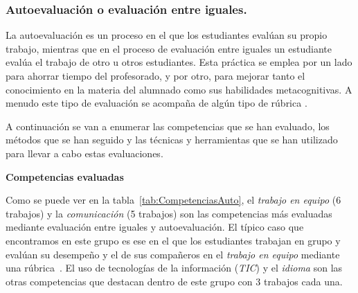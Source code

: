 \subsubsection{Autoevaluación o evaluación entre iguales.}

La autoevaluación es un proceso en el que los estudiantes evalúan su propio trabajo, mientras que  en el proceso de evaluación entre iguales un estudiante evalúa el trabajo de otro u otros estudiantes. Esta práctica se emplea por un lado para ahorrar tiempo del profesorado, y por otro, para mejorar tanto el conocimiento en la materia del alumnado como sus habilidades metacognitivas. A menudo este tipo de evaluación se acompaña de algún tipo de rúbrica \cite{malehorn1994ten}.

A continuación se van a enumerar las competencias que se han evaluado, los métodos que se han seguido y las técnicas y herramientas que se han utilizado para llevar a cabo estas evaluaciones.

\bigskip
\textbf{Competencias evaluadas}
\bigskip

Como se puede ver en la tabla~\ref{tab:CompetenciasAuto}, el \emph{trabajo en equipo} (6 trabajos) y la \emph{comunicación} (5 trabajos) son las competencias más evaluadas mediante evaluación entre iguales y autoevaluación. El típico caso que encontramos en este grupo es ese en el que los estudiantes trabajan en grupo y evalúan su desempeño y el de sus compañeros en el \emph{trabajo en equipo} mediante una rúbrica~\cite{ficapal2015learning}.
El uso de tecnologías de la información (\emph{TIC}) y el \emph{idioma} son las otras competencias que destacan dentro de este grupo con 3 trabajos cada una. 

